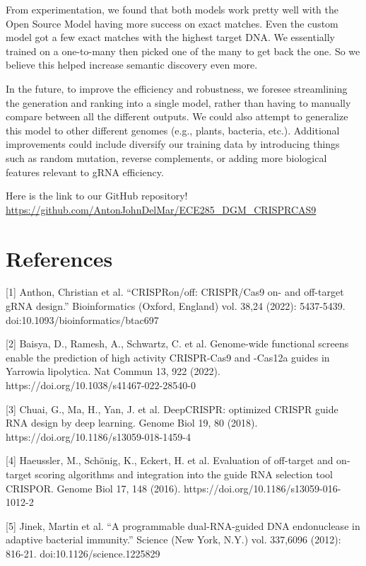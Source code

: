 \documentclass{article}
\begin{document}
From experimentation, we found that both models work pretty well with the Open Source Model having more success on exact matches. Even the custom model got a few exact matches with the highest target DNA. We essentially trained on a one-to-many then picked one of the many to get back the one. So we believe this helped increase semantic discovery even more. 

In the future, to improve the efficiency and robustness, we foresee streamlining the generation and ranking into a single model, rather than having to manually compare between all the different outputs. We could also attempt to generalize this model to other different genomes (e.g., plants, bacteria, etc.). Additional improvements could include diversify our training data by introducing things such as random mutation, reverse complements, or adding more biological features relevant to gRNA efficiency.

Here is the link to our GitHub repository! \\
\url{https://github.com/AntonJohnDelMar/ECE285_DGM_CRISPRCAS9}

\newpage

\section*{References}

\small
\label{Reference 1} [1] Anthon, Christian et al. “CRISPRon/off: CRISPR/Cas9 on- and off-target gRNA design.” Bioinformatics (Oxford, England) vol. 38,24 (2022): 5437-5439. doi:10.1093/bioinformatics/btac697 

\label{Reference 2} [2] Baisya, D., Ramesh, A., Schwartz, C. et al. Genome-wide functional screens enable the prediction of high activity CRISPR-Cas9 and -Cas12a guides in Yarrowia lipolytica. Nat Commun 13, 922 (2022). https://doi.org/10.1038/s41467-022-28540-0

\label{Reference 3} [3] Chuai, G., Ma, H., Yan, J. et al. DeepCRISPR: optimized CRISPR guide RNA design by deep learning. Genome Biol 19, 80 (2018). https://doi.org/10.1186/s13059-018-1459-4

\label{Reference 4} [4] Haeussler, M., Schönig, K., Eckert, H. et al. Evaluation of off-target and on-target scoring algorithms and integration into the guide RNA selection tool CRISPOR. Genome Biol 17, 148 (2016). https://doi.org/10.1186/s13059-016-1012-2

\label{Reference 5} [5] Jinek, Martin et al. “A programmable dual-RNA-guided DNA endonuclease in adaptive bacterial immunity.” Science (New York, N.Y.) vol. 337,6096 (2012): 816-21. doi:10.1126/science.1225829
\end{document}
